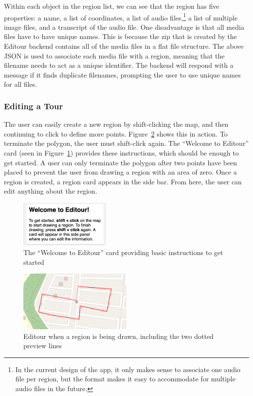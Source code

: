\documentclass[a4paper, 10pt, american, titlepage]{article}
\begin{document}
Within each object in the region list, we can see that the region has five
properties: a name, a list of coordinates, a list of audio files,\footnote{In
the current design of the app, it only makes sense to associate one audio file
per region, but the format makes it easy to accommodate for multiple audio
files in the future.} a list of multiple image files, and a transcript of the
audio file. One disadvantage is that all media files have to have unique names.
This is because the zip that is created by the Editour backend contains all of
the media files in a flat file structure. The above JSON is used to associate
each media file with a region, meaning that the filename needs to act as a
unique identifier. The backend will respond with a message if it finds
duplicate filenames, prompting the user to use unique names for all files.

\subsubsection{Editing a Tour}
\label{sec:editingATour}

The user can easily create a new region by shift-clicking the map, and then
continuing to click to define more points. Figure~\ref{fig:drawingRegion} shows
this in action. To terminate the polygon, the user must shift-click again. The
``Welcome to Editour'' card (seen in Figure~\ref{fig:welcomeCard}) provides
these instructions, which should be enough to get started. A user can only
terminate the polygon after two points have been placed to prevent the user
from drawing a region with an area of zero. Once a region is created, a region
card appears in the side bar. From here, the user can edit anything about the
region.

\begin{figure}[h]
	\centering
	\includegraphics[width=0.4\textwidth]{welcome-card-editour.png}
    \caption{The ``Welcome to Editour'' card providing basic instructions to
    get started}
	\label{fig:welcomeCard}
\end{figure}

\begin{figure}[h]
	\centering
	\includegraphics[width=0.5\textwidth]{drawing-region-editour.png}
	\caption{Editour when a region is being drawn, including the two dotted
		preview lines}
	\label{fig:drawingRegion}
\end{figure}
\end{document}
